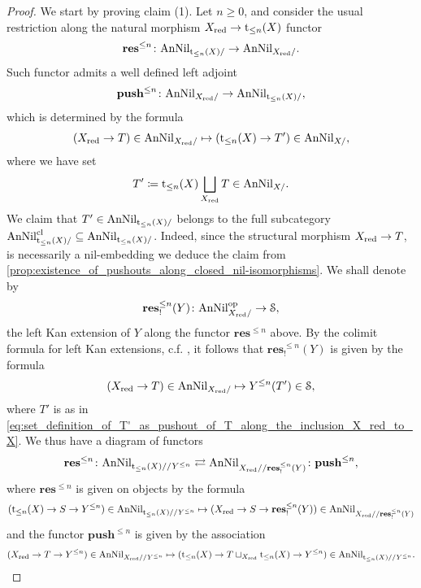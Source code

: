 \documentclass[10pt,a4paper,reqno]{amsart} %
\theoremstyle{plain}
\theoremstyle{definition}
\theoremstyle{remark}
\numberwithin{equation}{section}
\begin{document}
\begin{proof}
    We start by proving claim (1). Let $n \ge 0$, and consider the usual restriction along the natural morphism $X_{\mathrm{red}} \to \mathrm t_{\le n}(X)$ functor 
        \[\mathbf{res}^{\le n} \colon \mathrm{AnNil}_{\mathrm t_{\le n}(X)/} \to \mathrm{AnNil}_{X_{\mathrm{red}}/}.\]
    Such functor admits a well defined left adjoint
        \[\mathbf{push}^{\le n} \colon \mathrm{AnNil}_{X_{\mathrm{red}}/} \to \mathrm{AnNil}_{\mathrm t_{\le n}(X)/},\]
    which is determined by the formula
        \[
            (X_{\mathrm{red}} \to T) \in \mathrm{AnNil}_{X_{\mathrm{red}} /} \mapsto (\mathrm t_{\le n}(X) \to T') \in \mathrm{AnNil}_{X/},   
        \]
    where we have set
        \begin{equation} \label{eq:set_definition_of_T'_as_pushout_of_T_along_the_inclusion_X_red_to_X}
            T' \coloneqq \mathrm t_{\le n}(X) \bigsqcup_{X_{\mathrm{red}}} T \in \mathrm{AnNil}_{X/}.  
        \end{equation}
    We claim that $T' \in \mathrm{AnNil}_{\mathrm t_{\le n}(X)/}$ belongs to the full subcategory $\mathrm{AnNil}^{\mathrm{cl}}_{\mathrm t_{\le n}(X)/} \subseteq \mathrm{AnNil}_{\mathrm t_{\le n}(X)/}$.
    Indeed, since the structural morphism
        $X_{\mathrm{red}} \to T$,
    is necessarily a nil-embedding we deduce the claim from \cref{prop:existence_of_pushouts_along_closed_nil-isomorphisms}.
    We shall denote by
        \[
            \mathbf{res}^{\le n}_!(Y) \colon \mathrm{AnNil}^\mathrm{op}_{X_{\mathrm{red}} /} \to \mathcal S,
        \]
    the left Kan extension of $Y$ along the functor $\mathbf{res}^{\le n}$ above. By the colimit formula
    for left Kan extensions, c.f. \cite[Lemma 4.3.2.13]{HTT}, it follows that $\mathbf{res}^{\le n}_!(Y)$ is given by the formula
        \[
            (X_{\mathrm{red}} \to T) \in  \mathrm{AnNil}_{X_{\mathrm{red}} /} \mapsto Y^{\le n}(T') \in \mathcal S,
        \]
    where $T'$ is as in \eqref{eq:set_definition_of_T'_as_pushout_of_T_along_the_inclusion_X_red_to_X}. 
    We thus have a diagram of functors
        \[
            \mathbf{res}^{\le n} \colon \mathrm{AnNil}_{\mathrm t_{\le n}(X)/ /Y^{\le n}} \rightleftarrows \mathrm{AnNil}_{X_{\mathrm{red}} // \mathbf{res}^{\le n}_!(Y)} \colon \mathbf{push}^{\le n},
        \]
    where $\mathbf{res}^{\le n}$ is given on objects by the formula
        \[
            (\mathrm t_{\le n}(X) \to S \to Y^{\le n}) \in \mathrm{AnNil}_{\mathrm t_{\le n}(X)/ /Y^{\le n}} \mapsto (X_{\mathrm{red}} \to S \to \mathbf{res}_!^{\le n}(Y) )  \in \mathrm{AnNil}_{X_{\mathrm{red}} // \mathbf{res}^{\le n}_!(Y)} 
        \]
    and the functor $\mathbf{push}^{\le n}$ is given by the association
        \[
            (X_{\mathrm{red}} \to T \to Y^{\le n}) \in \mathrm{AnNil}_{X_{\mathrm{red}}/ /Y^{\le n}} \mapsto (\mathrm t_{\le n}(X) \to T \sqcup_{X_{\mathrm{red}}} \mathrm t_{\le n}(X) \to Y^{\le n}) \in \mathrm{AnNil}_{\mathrm t_{\le n}(X)/ /Y^{\le n}}.  
        \]

\end{proof}
\end{document}
